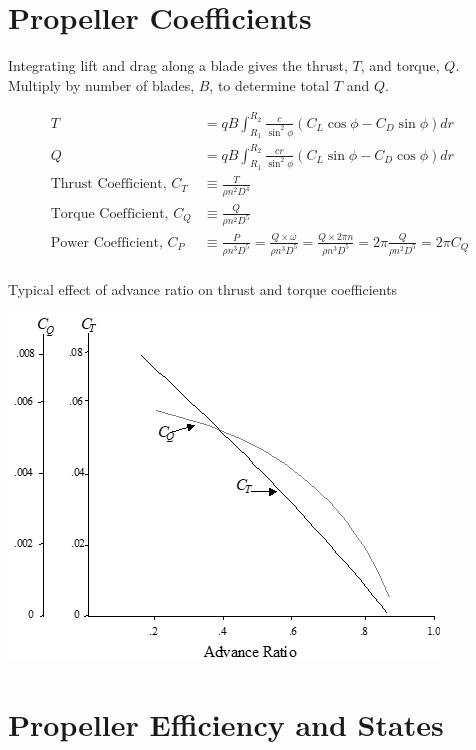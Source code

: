 \documentclass[
]{book}
\begin{document}
\hypertarget{propeller-coefficients}{%
\section{Propeller Coefficients}\label{propeller-coefficients}}

Integrating lift and drag along a blade gives the thrust, \(T\), and torque, \(Q\).
Multiply by number of blades, \(B\), to determine total \(T\) and \(Q\).

\[
\begin{align}
T &= qB \int_{R_1}^{R_2} \frac{c}{\sin^2 \phi} \left( C_L \cos \phi - C_D \sin \phi \right) dr \\
Q &= qB \int_{R_1}^{R_2} \frac{cr}{\sin^2 \phi} \left( C_L \sin \phi - C_D \cos \phi \right) dr \\
\text{Thrust Coefficient, } C_T &\equiv \frac{T}{\rho n^2 D^4} \\
\text{Torque Coefficient, } C_Q &\equiv \frac{Q}{\rho n^2 D^5} \\
\text{Power Coefficient, } C_P &\equiv \frac{P}{\rho n^3 D^5} = \frac{Q \times \omega}{\rho n^3 D^5} = \frac{Q \times 2 \pi n}{\rho n^3 D^5} = 2 \pi \frac{Q}{\rho n^2 D^5} = 2 \pi C_Q \\
\end{align}
\]

Typical effect of advance ratio on thrust and torque coefficients

\includegraphics[width=4.49931in,height=3.62431in]{media/11/image13.png}

\hypertarget{propeller-efficiency-and-states}{%
\section{Propeller Efficiency and States}\label{propeller-efficiency-and-states}}
\end{document}
